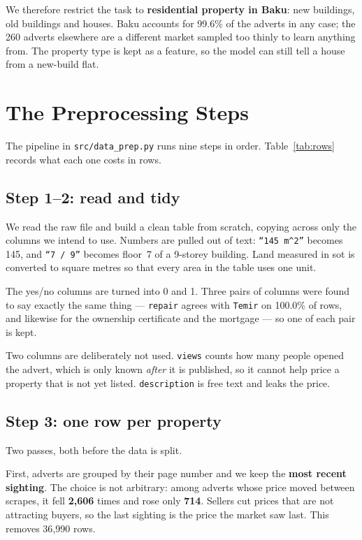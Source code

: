 \documentclass[10pt,twocolumn,a4paper]{article}
\begin{document}
We therefore restrict the task to \textbf{residential property in Baku}:
new buildings, old buildings and houses. Baku accounts for 99.6\% of the
adverts in any case; the 260 adverts elsewhere are a different market
sampled too thinly to learn anything from. The property type is kept as
a feature, so the model can still tell a house from a new-build flat.

\section{The Preprocessing Steps}

The pipeline in \texttt{src/data\_prep.py} runs nine steps in order.
Table~\ref{tab:rows} records what each one costs in rows.

\subsection{Step 1--2: read and tidy}

We read the raw file and build a clean table from scratch, copying across
only the columns we intend to use. Numbers are pulled out of text:
\texttt{``145 m$^2$''} becomes 145, and \texttt{``7 / 9''} becomes floor~7
of a 9-storey building. Land measured in sot is converted to square
metres so that every area in the table uses one unit.

The yes/no columns are turned into 0 and 1. Three pairs of columns were
found to say exactly the same thing --- \texttt{repair} agrees with
\texttt{Temir} on 100.0\% of rows, and likewise for the
ownership certificate and the mortgage --- so one of each pair is kept.

Two columns are deliberately not used. \texttt{views} counts how many
people opened the advert, which is only known \emph{after} it is
published, so it cannot help price a property that is not yet listed.
\texttt{description} is free text and leaks the price.

\subsection{Step 3: one row per property}

Two passes, both before the data is split.

First, adverts are grouped by their page number and we keep the
\textbf{most recent sighting}. The choice is not arbitrary: among adverts
whose price moved between scrapes, it fell \textbf{2{,}606} times and
rose only \textbf{714}. Sellers cut prices that are not attracting
buyers, so the last sighting is the price the market saw last. This
removes 36{,}990 rows.
\end{document}
